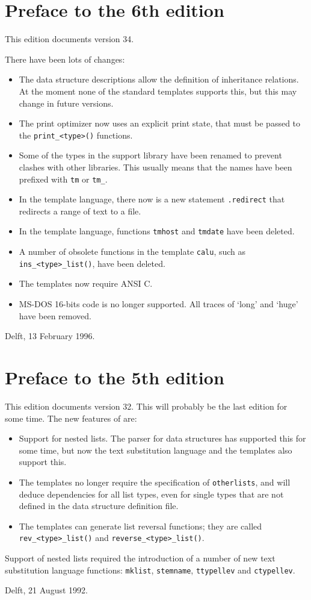 \section{Preface to the 6th edition}
This edition documents {\Tm} version 34.
\par
There have been lots of changes:
\begin{itemize}
\item The data structure descriptions allow the definition of inheritance
      relations. At the moment none of the standard templates supports
      this, but this may change in future versions.
\item The print optimizer now uses an explicit print state, that must
      be passed to the \verb"print_<type>()" functions.
\item Some of the types in the {\C} support library have been
      renamed to prevent clashes with other libraries. This usually means
      that the names have been prefixed with \verb'tm' or \verb'tm_'.
\item In the template language, there now is a new statement \verb'.redirect'
      that redirects a range of text to a file.
\item In the template language, functions \verb'tmhost' and \verb'tmdate' 
      have been deleted.
\item A number of obsolete functions in the {\C} template \verb'calu', such as
      \verb"ins_<type>_list()", have been deleted.
\item The {\C} templates now require ANSI C.
\item MS-DOS 16-bits code is no longer supported. All traces of `long'
      and `huge' have been removed.
\end{itemize}
\begin{flushright}
Delft, 13 February 1996.
\end{flushright}
\section{Preface to the 5th edition}
This edition documents {\Tm} version 32.
This will probably be the last edition for some time. The new features
of {\Tm} are:
\begin{itemize}
\item Support for nested lists. The parser for data structures has
supported this for some time, but now the text substitution language
and the {\C} templates also support this.
\item The {\C} templates no longer require the specification of
\texttt{otherlists}, and will deduce dependencies for all list types,
even for single types that are not defined in the data structure definition
file.
\item The {\C} templates can generate list reversal functions; they
      are called \verb+rev_<type>_list()+ and \verb+reverse_<type>_list()+.
\end{itemize}
Support of nested lists required the introduction of a number of new
{\Tm} text substitution language functions: \verb+mklist+, \verb+stemname+,
\verb+ttypellev+ and \verb+ctypellev+.
\begin{flushright}
Delft, 21 August 1992.
\end{flushright}
